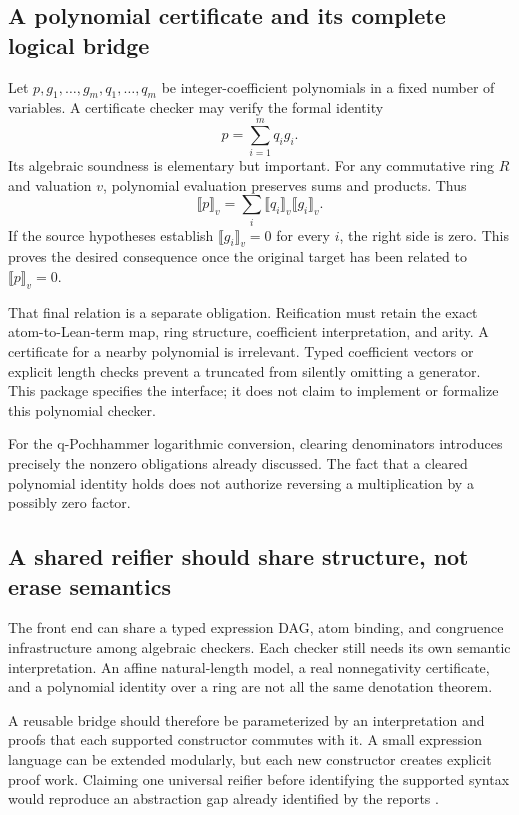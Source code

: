 \documentclass[11pt,a4paper]{article}
\theoremstyle{definition}
\theoremstyle{remark}
\newcommand{\code}[1]{\texttt{\detokenize{#1}}}
\newcommand{\sem}[1]{\llbracket #1\rrbracket}
\begin{document}
\subsection{A polynomial certificate and its complete logical bridge}
Let $p,g_1,\ldots,g_m,q_1,\ldots,q_m$ be integer-coefficient polynomials in a
fixed number of variables. A certificate checker may verify the formal identity
\begin{equation}\label{eq:ideal-cert}
 p=\sum_{i=1}^m q_i g_i.
\end{equation}
Its algebraic soundness is elementary but important. For any commutative ring
$R$ and valuation $v$, polynomial evaluation preserves sums and products. Thus
\[
 \sem{p}_v=\sum_i\sem{q_i}_v\sem{g_i}_v.
\]
If the source hypotheses establish $\sem{g_i}_v=0$ for every $i$, the right side
is zero. This proves the desired consequence once the original target has been
related to $\sem p_v=0$.

That final relation is a separate obligation. Reification must retain the
exact atom-to-Lean-term map, ring structure, coefficient interpretation, and
arity. A certificate for a nearby polynomial is irrelevant. Typed coefficient
vectors or explicit length checks prevent a truncated \code{zip} from silently
omitting a generator. This package specifies the interface; it does not claim
to implement or formalize this polynomial checker.

For the q-Pochhammer logarithmic conversion, clearing denominators introduces
precisely the nonzero obligations already discussed. The fact that a cleared
polynomial identity holds does not authorize reversing a multiplication by a
possibly zero factor.

\subsection{A shared reifier should share structure, not erase semantics}
The front end can share a typed expression DAG, atom binding, and congruence
infrastructure among algebraic checkers. Each checker still needs its own
semantic interpretation. An affine natural-length model, a real
nonnegativity certificate, and a polynomial identity over a ring are not all
the same denotation theorem.

A reusable bridge should therefore be parameterized by an interpretation and
proofs that each supported constructor commutes with it. A small expression
language can be extended modularly, but each new constructor creates explicit
proof work. Claiming one universal reifier before identifying the supported
syntax would reproduce an abstraction gap already identified by the reports
\cite{synA,synB}.
\end{document}
